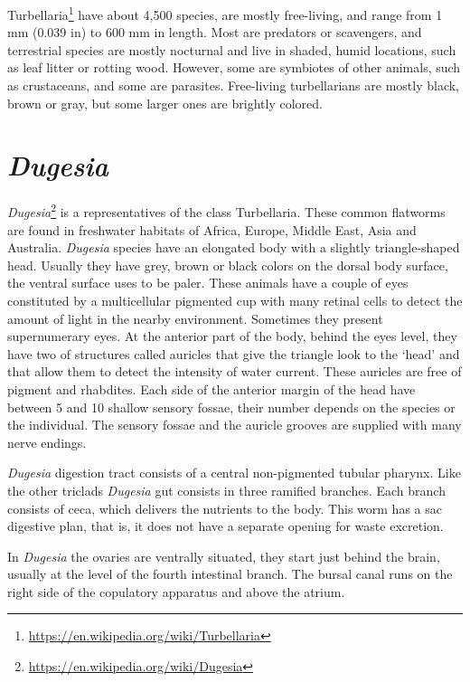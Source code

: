 \documentclass[]{book}
\let\rmarkdownfootnote\footnote%
\def\footnote{\protect\rmarkdownfootnote}
\renewcommand{\href}[2]{#2\footnote{\url{#1}}}
\begin{document}
\href{https://en.wikipedia.org/wiki/Turbellaria}{Turbellaria} have about 4,500 species, are mostly free-living, and range from 1 mm (0.039 in) to 600 mm in length. Most are predators or scavengers, and terrestrial species are mostly nocturnal and live in shaded, humid locations, such as leaf litter or rotting wood. However, some are symbiotes of other animals, such as crustaceans, and some are parasites. Free-living turbellarians are mostly black, brown or gray, but some larger ones are brightly colored.

\hypertarget{dugesia}{%
\section{\texorpdfstring{\emph{Dugesia}}{Dugesia}}\label{dugesia}}

\href{https://en.wikipedia.org/wiki/Dugesia}{\emph{Dugesia}} is a representatives of the class Turbellaria. These common flatworms are found in freshwater habitats of Africa, Europe, Middle East, Asia and Australia. \emph{Dugesia} species have an elongated body with a slightly triangle-shaped head. Usually they have grey, brown or black colors on the dorsal body surface, the ventral surface uses to be paler. These animals have a couple of eyes constituted by a multicellular pigmented cup with many retinal cells to detect the amount of light in the nearby environment. Sometimes they present supernumerary eyes. At the anterior part of the body, behind the eyes level, they have two of structures called auricles that give the triangle look to the `head' and that allow them to detect the intensity of water current. These auricles are free of pigment and rhabdites. Each side of the anterior margin of the head have between 5 and 10 shallow sensory fossae, their number depends on the species or the individual. The sensory fossae and the auricle grooves are supplied with many nerve endings.

\emph{Dugesia} digestion tract consists of a central non-pigmented tubular pharynx. Like the other triclads \emph{Dugesia} gut consists in three ramified branches. Each branch consists of ceca, which delivers the nutrients to the body. This worm has a sac digestive plan, that is, it does not have a separate opening for waste excretion.

In \emph{Dugesia} the ovaries are ventrally situated, they start just behind the brain, usually at the level of the fourth intestinal branch. The bursal canal runs on the right side of the copulatory apparatus and above the atrium.
\end{document}

